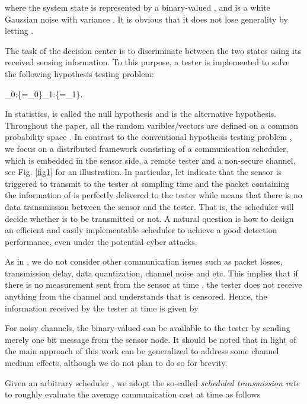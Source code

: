\documentclass[journal]{IEEEtran}
\def\cH{\mathcal{H}}
\def\bee{}
\begin{document}
where the system state is represented by a binary-valued , and  is a white Gaussian noise with variance .
It is obvious that it does not lose generality by letting .

The task of the decision center is to discriminate between the two states using its received sensing information. To this purpose, a tester is implemented to solve the following hypothesis testing problem:
\bee
\label{prb_test}
\cH_{0}:\{\theta=\theta_{0}\}\quad\quad {}\quad\quad \cH_{1}:\{\theta=\theta_{1}\}.
\ene

In statistics,  is called the null hypothesis and  is the alternative hypothesis. Throughout the paper, all the random varibles/vectors are defined on a common probability space . In contrast to the conventional hypothesis testing problem \cite{casella2001statistical}, we focus on a distributed framework consisting of a communication scheduler, which is embedded in the sensor side,
a remote tester and a non-secure channel, see Fig. \ref{fig1} for an illustration. In particular, let  indicate that the sensor is triggered to transmit  to the tester at sampling time  and the packet containing the information of  is perfectly delivered to the tester while  means that there is no data transmission between the sensor and the tester. That is, the scheduler will decide whether  is to be transmitted or not. A natural question is how to design an efficient and easily implementable scheduler to achieve a good detection performance, even under the potential cyber attacks.



As in \cite{you2013kalman}, we do not consider other communication issues such as packet losses, transmission delay, data quantization, channel noise and etc. This implies that if there is no measurement sent from the sensor at time , the tester does not receive anything from the channel and understands that  is censored. Hence, the  information received by the tester at time  is given by


For noisy channels, the binary-valued  can be available to the tester by sending merely one bit message from the sensor node. It should be noted that in light of \cite{you2013asymptotically} the main approach of this work can be generalized to address some channel medium effects, although we do not plan to do so for brevity.


Given an arbitrary scheduler , we adopt the so-called {\em scheduled transmission rate}\cite{you2013asymptotically} to roughly evaluate the average communication cost at time  as follows
\end{document}
